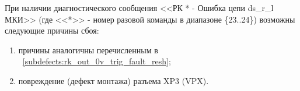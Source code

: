 \begin{sloppypar}
    \subpoint При наличии диагностического сообщения <<РК * - Ошибка цепи ds\_r\_l МКИ>> 
	      (где <<*>> - номер разовой команды в диапазоне \{23..24\}) возможны следующие причины сбоя:
	  \begin{enumerate}
	    \item причины аналогичны перечисленным в ~\ref{subdefects:rk_out_0v_trig_fault_resh};%
	    \item повреждение (дефект монтажа) разъема XP3 (VPX).
	  \end{enumerate}

%
%	  
     
  \end{sloppypar}

